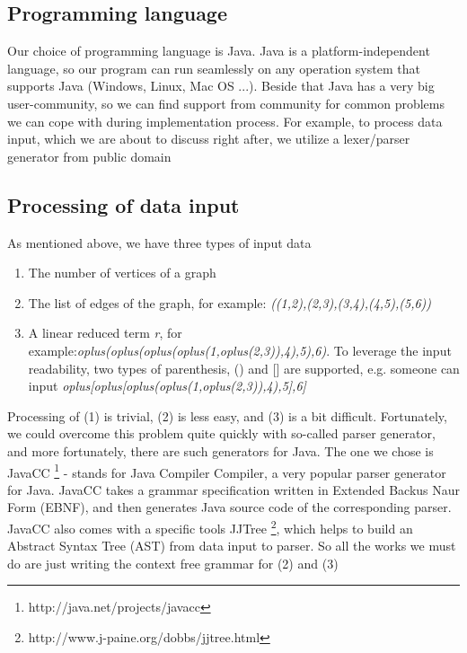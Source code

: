 \documentclass[a4paper, 12pt]{article}
\begin{document}
\subsection{Programming language}
Our choice of programming language is Java. Java is a platform-independent language, so our program can run seamlessly on any operation system that supports Java (Windows, Linux, Mac OS ...).\newline\newline
Beside that Java has a very big user-community, so we can find support from community for common problems we can cope with during implementation process. For example, to process data input, which we are about to discuss right after, we utilize a lexer/parser generator from public domain

\subsection{Processing of data input}

As mentioned above, we have three types of input data 
\begin{enumerate}
\item The number of vertices of a graph 
\item The list of edges of the graph, for example: \textit {((1,2),(2,3),(3,4),(4,5),(5,6))}
\item A linear reduced term \textit {r}, for example:\textit {oplus(oplus(oplus(oplus(1,oplus(2,3)),4),5),6)}. To leverage the input readability, two types of parenthesis, () and {[}{]} are supported, e.g. someone can input \textit {oplus{[}oplus{[}oplus(oplus(1,oplus(2,3)),4),5{]},6{]}}
\end{enumerate}
Processing of (1) is trivial, (2) is less easy, and (3) is a bit difficult. Fortunately, we could overcome this problem quite quickly with so-called parser generator, and more fortunately, there are such
generators for Java. The one we chose is JavaCC \footnote {http://java.net/projects/javacc} - stands for Java Compiler Compiler, a very popular parser generator for Java. JavaCC takes a grammar specification written in Extended Backus Naur Form (EBNF), and then generates Java source code of the corresponding parser. JavaCC also comes with a specific tools JJTree \footnote {http://www.j-paine.org/dobbs/jjtree.html}, which helps to build an Abstract Syntax Tree (AST) from data input to parser. So all the works we must do are just writing the context free grammar for (2) and (3) 
\end{document}
